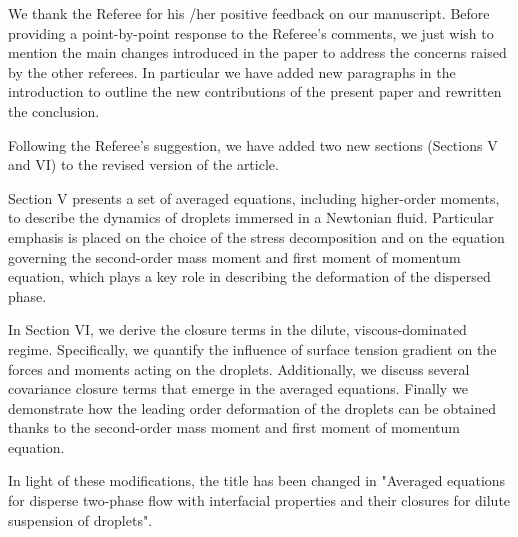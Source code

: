 \documentclass[10pt,a4paper]{article}
\newcommand{\tb}[1]{\color{blue}#1\color{black}}
\begin{document}
\tb{
    We thank the Referee for his /her positive feedback on our manuscript. 
    Before providing a point-by-point response to the Referee’s comments, we just wish to mention the main changes introduced in the paper to address the concerns raised by the other referees.
    In particular we have added new paragraphs in the introduction to outline the new contributions of the present paper and rewritten the conclusion.



Following the Referee’s suggestion, we have added two new sections (Sections V and VI) to the revised version of the article.

Section V presents a set of averaged equations, including higher-order moments, to describe the dynamics of droplets immersed in a Newtonian fluid. 
Particular emphasis is placed on the choice of the stress decomposition and on the equation governing the second-order mass moment and first moment of momentum equation, which plays a key role in describing the deformation of the dispersed phase.

In Section VI, we derive the closure terms in the dilute, viscous-dominated regime. 
Specifically, we quantify the influence of surface tension gradient on the forces and moments acting on the droplets. 
Additionally, we discuss several covariance closure terms that emerge in the averaged equations.
Finally we demonstrate how the leading order deformation of the droplets can be obtained thanks to the second-order mass moment and first moment of momentum equation.

In light of these modifications, the title has been changed in "Averaged equations for disperse two-phase flow with interfacial properties and their closures for dilute suspension of droplets".

}
\end{document}
